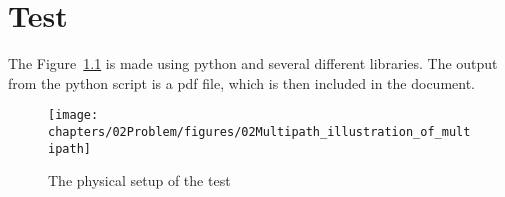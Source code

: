 \chapter{Test}\label{sec:Test}

The Figure~\ref{fig:physical_setup} is made using python and several different libraries.
The output from the python script is a pdf file, which is then included in the document.
\begin{figure}[H]
    \centering
    \texttt{[image: chapters/02Problem/figures/02Multipath\_illustration\_of\_multipath]}
    \caption{The physical setup of the test}
    \label{fig:physical_setup}
\end{figure}